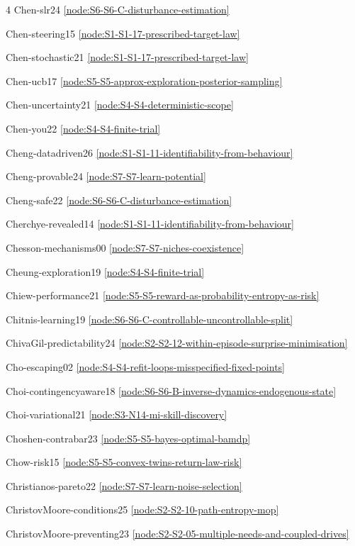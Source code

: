 \documentclass[10pt]{article}
\begin{document}
{\begin{multicols}{4}
Chen-slr24 \hfill \ref{node:S6-S6-C-disturbance-estimation}\par
Chen-steering15 \hfill \ref{node:S1-S1-17-prescribed-target-law}\par
Chen-stochastic21 \hfill \ref{node:S1-S1-17-prescribed-target-law}\par
Chen-ucb17 \hfill \ref{node:S5-S5-approx-exploration-posterior-sampling}\par
Chen-uncertainty21 \hfill \ref{node:S4-S4-deterministic-scope}\par
Chen-you22 \hfill \ref{node:S4-S4-finite-trial}\par
Cheng-datadriven26 \hfill \ref{node:S1-S1-11-identifiability-from-behaviour}\par
Cheng-provable24 \hfill \ref{node:S7-S7-learn-potential}\par
Cheng-safe22 \hfill \ref{node:S6-S6-C-disturbance-estimation}\par
Cherchye-revealed14 \hfill \ref{node:S1-S1-11-identifiability-from-behaviour}\par
Chesson-mechanisms00 \hfill \ref{node:S7-S7-niches-coexistence}\par
Cheung-exploration19 \hfill \ref{node:S4-S4-finite-trial}\par
Chiew-performance21 \hfill \ref{node:S5-S5-reward-as-probability-entropy-as-risk}\par
Chitnis-learning19 \hfill \ref{node:S6-S6-C-controllable-uncontrollable-split}\par
ChivaGil-predictability24 \hfill \ref{node:S2-S2-12-within-episode-surprise-minimisation}\par
Cho-escaping02 \hfill \ref{node:S4-S4-refit-loops-misspecified-fixed-points}\par
Choi-contingencyaware18 \hfill \ref{node:S6-S6-B-inverse-dynamics-endogenous-state}\par
Choi-variational21 \hfill \ref{node:S3-N14-mi-skill-discovery}\par
Choshen-contrabar23 \hfill \ref{node:S5-S5-bayes-optimal-bamdp}\par
Chow-risk15 \hfill \ref{node:S5-S5-convex-twins-return-law-risk}\par
Christianos-pareto22 \hfill \ref{node:S7-S7-learn-noise-selection}\par
ChristovMoore-conditions25 \hfill \ref{node:S2-S2-10-path-entropy-mop}\par
ChristovMoore-preventing23 \hfill \ref{node:S2-S2-05-multiple-needs-and-coupled-drives}\par

\end{multicols}}
\end{document}
